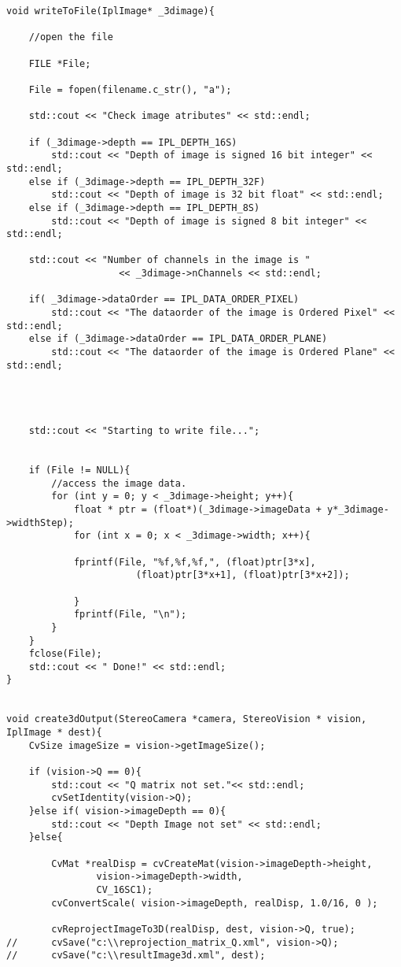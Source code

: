 \begin{lstlisting}
void writeToFile(IplImage* _3dimage){

	//open the file

	FILE *File;

	File = fopen(filename.c_str(), "a");

	std::cout << "Check image atributes" << std::endl;

	if (_3dimage->depth == IPL_DEPTH_16S)
		std::cout << "Depth of image is signed 16 bit integer" << std::endl;
	else if (_3dimage->depth == IPL_DEPTH_32F)
		std::cout << "Depth of image is 32 bit float" << std::endl;
	else if (_3dimage->depth == IPL_DEPTH_8S)
		std::cout << "Depth of image is signed 8 bit integer" << std::endl;

	std::cout << "Number of channels in the image is " 
                    << _3dimage->nChannels << std::endl;

	if( _3dimage->dataOrder == IPL_DATA_ORDER_PIXEL)
		std::cout << "The dataorder of the image is Ordered Pixel" << std::endl;
	else if (_3dimage->dataOrder == IPL_DATA_ORDER_PLANE)
		std::cout << "The dataorder of the image is Ordered Plane" << std::endl;




	std::cout << "Starting to write file...";


	if (File != NULL){
		//access the image data.
		for (int y = 0; y < _3dimage->height; y++){
			float * ptr = (float*)(_3dimage->imageData + y*_3dimage->widthStep);
			for (int x = 0; x < _3dimage->width; x++){

            fprintf(File, "%f,%f,%f,", (float)ptr[3*x], 
                       (float)ptr[3*x+1], (float)ptr[3*x+2]);

			}
			fprintf(File, "\n");
		}
	}
	fclose(File);
	std::cout << " Done!" << std::endl;
}


void create3dOutput(StereoCamera *camera, StereoVision * vision, IplImage * dest){
	CvSize imageSize = vision->getImageSize();

	if (vision->Q == 0){
		std::cout << "Q matrix not set."<< std::endl;
		cvSetIdentity(vision->Q);
	}else if( vision->imageDepth == 0){
		std::cout << "Depth Image not set" << std::endl;
	}else{

		CvMat *realDisp = cvCreateMat(vision->imageDepth->height,
				vision->imageDepth->width,
				CV_16SC1);
		cvConvertScale( vision->imageDepth, realDisp, 1.0/16, 0 );

		cvReprojectImageTo3D(realDisp, dest, vision->Q, true);
//		cvSave("c:\\reprojection_matrix_Q.xml", vision->Q);
//		cvSave("c:\\resultImage3d.xml", dest);


\end{lstlisting}
